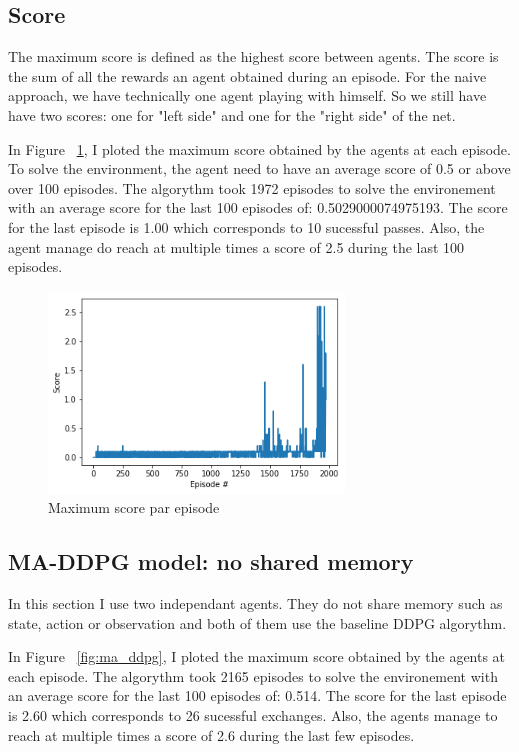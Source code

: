 \documentclass[12pt]{article}
\begin{document}
\subsection{Score}
The maximum score is defined as the highest score between agents. The score is the sum of all the rewards an agent obtained during an episode. For the naive approach, we have technically one agent playing with himself. So we still have have two scores: one for "left side" and one for the "right side" of the net.

In Figure ~\ref{fig:ddpg}, I ploted the maximum score obtained by the agents at each episode. 
To solve the environment, the agent need to have an average score of 0.5 or above over 100 episodes. The algorythm took 1972 episodes to solve the environement with an average score for the last 100 episodes of: 0.5029000074975193.	The score for the last episode is 1.00 which corresponds to 10 sucessful passes. Also, the agent manage do reach at multiple times a score of 2.5 during the last 100 episodes.

\begin{center}
\begin{figure}[H]
  \center
  \includegraphics[width=0.7\textwidth]{../PNG/ddpg.png}
  \caption{Maximum score par episode}
  \label{fig:ddpg}
\end{figure}
\end{center}


\subsection{MA-DDPG model: no shared memory} 
In this section I use two independant agents. They do not share memory such as state, action or observation and both of them use the baseline DDPG algorythm.

In Figure ~\ref{fig:ma_ddpg}, I ploted the maximum score obtained by the agents at each episode. 
The algorythm took 2165 episodes to solve the environement with an average score for the last 100 episodes of: 0.514.	The score for the last episode is 2.60 which corresponds to 26 sucessful exchanges. Also, the agents manage to reach at multiple times a score of 2.6 during the last few episodes.
\end{document}

